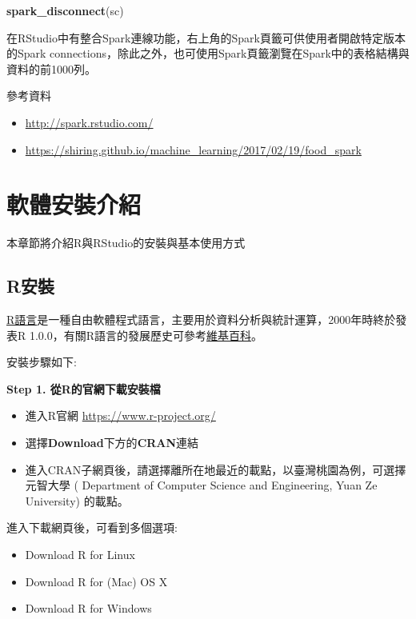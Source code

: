 \documentclass[]{book}
\newenvironment{Shaded}{\begin{snugshade}}{\end{snugshade}}
\newcommand{\KeywordTok}[1]{\textcolor[rgb]{0.13,0.29,0.53}{\textbf{{#1}}}}
\newcommand{\NormalTok}[1]{{#1}}
\providecommand{\tightlist}{%
  \setlength{\itemsep}{0pt}\setlength{\parskip}{0pt}}
\theoremstyle{definition}
\theoremstyle{definition}
\theoremstyle{remark}
\begin{document}
\begin{Shaded}
\begin{Highlighting}[]
\KeywordTok{spark_disconnect}\NormalTok{(sc)}
\end{Highlighting}
\end{Shaded}

在RStudio中有整合Spark連線功能，右上角的Spark頁籤可供使用者開啟特定版本的Spark
connections，除此之外，也可使用Spark頁籤瀏覽在Spark中的表格結構與資料的前1000列。

參考資料

\begin{itemize}
\tightlist
\item
  \url{http://spark.rstudio.com/}
\item
  \url{https://shiring.github.io/machine_learning/2017/02/19/food_spark}
\end{itemize}

\chapter{軟體安裝介紹}\label{install}

本章節將介紹R與RStudio的安裝與基本使用方式

\section{R安裝}\label{r}

\href{http://www.r-project.org/}{R語言}是一種自由軟體程式語言，主要用於資料分析與統計運算，2000年時終於發表R
1.0.0，有關R語言的發展歷史可參考\href{https://zh.wikipedia.org/wiki/R\%E8\%AF\%AD\%E8\%A8\%80}{維基百科}。

安裝步驟如下:

\textbf{Step 1. 從R的官網下載安裝檔}

\begin{itemize}
\tightlist
\item
  進入R官網 \url{https://www.r-project.org/}
\item
  選擇\textbf{Download}下方的\textbf{CRAN}連結
\item
  進入CRAN子網頁後，請選擇離所在地最近的載點，以臺灣桃園為例，可選擇元智大學
  ( Department of Computer Science and Engineering, Yuan Ze University)
  的載點。
\end{itemize}

進入下載網頁後，可看到多個選項:

\begin{itemize}
\tightlist
\item
  Download R for Linux
\item
  Download R for (Mac) OS X
\item
  Download R for Windows
\end{itemize}
\end{document}
